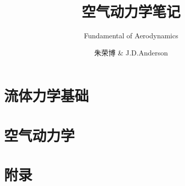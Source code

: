 \documentclass[lang=cn,source,XITS,zihao=-4,scheme=chinese]{elegantbook}
\title{空气动力学笔记}
\subtitle{Fundamental of Aerodynamics}
\author{朱荣博 \& J.D.Anderson}
\begin{document}
\maketitle
\frontmatter

\tableofcontents

\mainmatter

\part{流体力学基础}





\part{空气动力学}



\part{附录}
\appendix


\end{document}
